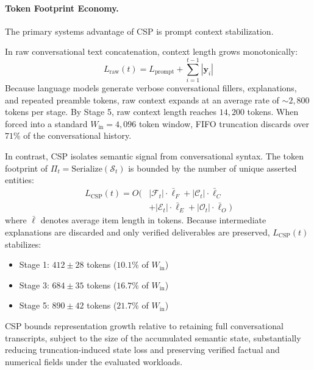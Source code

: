 \paragraph{Token Footprint Economy.}
The primary systems advantage of CSP is prompt context stabilization. 

In raw conversational text concatenation, context length grows monotonically:
\begin{equation}
L_{\text{raw}}(t) = L_{\text{prompt}} + \sum_{i=1}^{t-1} |\mathbf{y}_i|
\end{equation}
Because language models generate verbose conversational fillers, explanations, and repeated preamble tokens, raw context expands at an average rate of $\sim 2,800$ tokens per stage. By Stage 5, raw context length reaches $14,200$ tokens. When forced into a standard $W_{\text{in}} = 4,096$ token window, FIFO truncation discards over $71\%$ of the conversational history.

In contrast, CSP isolates semantic signal from conversational syntax. The token footprint of $\Pi_t = \text{Serialize}(\mathcal{S}_t)$ is bounded by the number of unique asserted entities:
\begin{equation}
\begin{aligned}
L_{\text{CSP}}(t) = O\Big(&|\mathcal{F}_t| \cdot \bar{\ell}_F + |\mathcal{C}_t| \cdot \bar{\ell}_C \\
&+ |\mathcal{E}_t| \cdot \bar{\ell}_E + |\mathcal{O}_t| \cdot \bar{\ell}_O\Big)
\end{aligned}
\end{equation}
where $\bar{\ell}$ denotes average item length in tokens. Because intermediate explanations are discarded and only verified deliverables are preserved, $L_{\text{CSP}}(t)$ stabilizes:
\begin{itemize}
    \item Stage 1: $412 \pm 28$ tokens ($10.1\%$ of $W_{\text{in}}$)
    \item Stage 3: $684 \pm 35$ tokens ($16.7\%$ of $W_{\text{in}}$)
    \item Stage 5: $890 \pm 42$ tokens ($21.7\%$ of $W_{\text{in}}$)
\end{itemize}
CSP bounds representation growth relative to retaining full conversational transcripts, subject to the size of the accumulated semantic state, substantially reducing truncation-induced state loss and preserving verified factual and numerical fields under the evaluated workloads.
